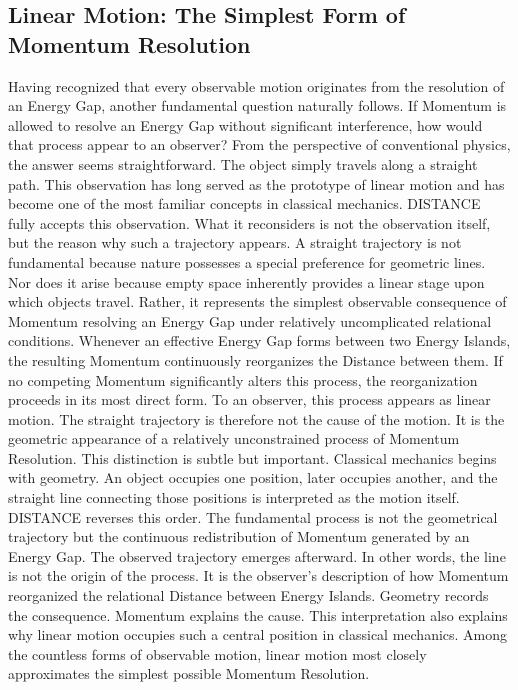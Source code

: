 \subsection*{\textbf{Linear Motion: The Simplest Form of Momentum Resolution}}

Having recognized that every observable motion originates from the resolution of an Energy Gap, another fundamental question naturally follows.
If Momentum is allowed to resolve an Energy Gap without significant interference, how would that process appear to an observer?
From the perspective of conventional physics, the answer seems straightforward. The object simply travels along a straight path. This observation has long served as the prototype of linear motion and has become one of the most familiar concepts in classical mechanics.
DISTANCE fully accepts this observation.
What it reconsiders is not the observation itself, but the reason why such a trajectory appears.
A straight trajectory is not fundamental because nature possesses a special preference for geometric lines. Nor does it arise because empty space inherently provides a linear stage upon which objects travel.
Rather, it represents the simplest observable consequence of Momentum resolving an Energy Gap under relatively uncomplicated relational conditions.
Whenever an effective Energy Gap forms between two Energy Islands, the resulting Momentum continuously reorganizes the Distance between them. If no competing Momentum significantly alters this process, the reorganization proceeds in its most direct form.
To an observer, this process appears as linear motion.
The straight trajectory is therefore not the cause of the motion.
It is the geometric appearance of a relatively unconstrained process of Momentum Resolution.
This distinction is subtle but important.
Classical mechanics begins with geometry.
An object occupies one position, later occupies another, and the straight line connecting those positions is interpreted as the motion itself.
DISTANCE reverses this order.
The fundamental process is not the geometrical trajectory but the continuous redistribution of Momentum generated by an Energy Gap.
The observed trajectory emerges afterward.
In other words, the line is not the origin of the process.
It is the observer's description of how Momentum reorganized the relational Distance between Energy Islands.
Geometry records the consequence.
Momentum explains the cause.
This interpretation also explains why linear motion occupies such a central position in classical mechanics.
Among the countless forms of observable motion, linear motion most closely approximates the simplest possible Momentum Resolution.
